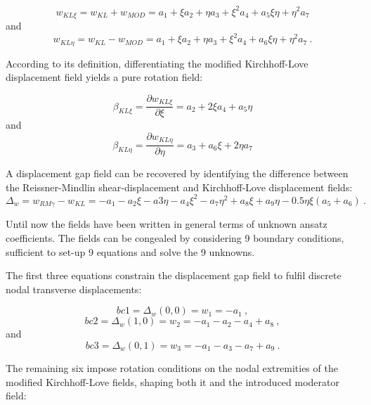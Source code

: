 \begin{equation} 
w_{KL \xi} = w_{KL} + w_{MOD} = a_1 + \xi a_2 + \eta a_3 + \xi^2 a_4 +a_5 \xi \eta + \eta^2 a_7
\label{eqDSGc3_4}
\end{equation}
and
\begin{equation} 
w_{KL \eta} = w_{KL} - w_{MOD} = a_1 + \xi a_2 + \eta a_3 + \xi^2 a_4 +a_6 \xi \eta + \eta^2 a_7
\label{eqDSGc3_5}\ .
\end{equation}

According to its definition, differentiating the modified Kirchhoff-Love displacement field yields a pure rotation field:

\begin{equation} 
\beta_{KL \xi} = \frac{\partial w_{KL \xi}}{\partial \xi}  = a_2 + 2 \xi a_4 +a_5 \eta
\label{eqDSGc3_8}
\end{equation}
and
\begin{equation} 
\beta_{KL \eta} = \frac{\partial w_{KL \eta}}{\partial \eta}  =a_3 +a_6 \xi + 2 \eta a_7
\label{eqDSGc3_9}
\end{equation}

A displacement gap field can be recovered by identifying the difference between the Reissner-Mindlin shear-displacement and Kirchhoff-Love displacement fields:
\begin{equation} 
\Delta_w = w_{RM\gamma} - w_{KL}  =-a_1 - a_2\xi - a3\eta - a_4\xi^2 - a_7\eta^2 + a_8\xi + a_9\eta - 0.5\eta\xi(a_5 + a_6)
\label{eqDSGc3_10}\ .
\end{equation}

Until now the fields have been written in general terms of unknown ansatz coefficients. The fields can be congealed by considering 9 boundary conditions, sufficient to set-up 9 equations and solve the 9 unknowns.

The first three equations constrain the displacement gap field to fulfil discrete nodal transverse displacements:

\begin{equation} 
bc1 = \Delta_w(0,0) = w_1 = -a_1
\label{eqDSGc3_11}\ ,
\end{equation}
\begin{equation} 
bc2 = \Delta_w(1,0) = w_2 = -a_1 -a_2 -a_4 + a_8
\label{eqDSGc3_12}\ ,
\end{equation}
and
\begin{equation} 
bc3 = \Delta_w(0,1) = w_3 = -a_1 -a_3 -a_7 + a_9
\label{eqDSGc3_13}\ .
\end{equation}

The remaining six impose rotation conditions on the nodal extremities of the modified Kirchhoff-Love fields, shaping both it and the introduced moderator field:

